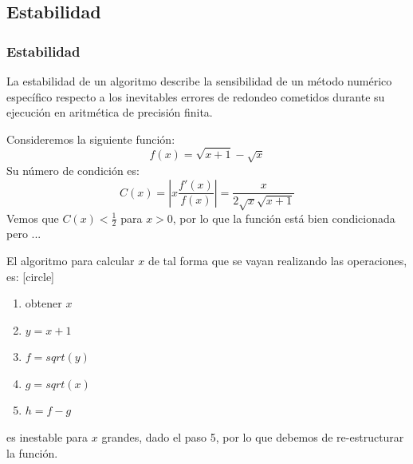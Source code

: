 \subsection{Estabilidad}
\begin{frame}
\frametitle{Estabilidad}
La estabilidad de un algoritmo describe la sensibilidad de un método numérico específico
respecto a los inevitables errores de redondeo cometidos durante su ejecución en aritmética de precisión finita.
\end{frame}
\begin{frame}
Consideremos la siguiente función:
\[ f(x) = \sqrt{x+1} - \sqrt{x} \]
Su número de condición es:
\[ C(x) = \left | x \dfrac{f'(x)}{f(x)} \right | = \dfrac{x}{2 \sqrt{x} \sqrt{x+1}}\]
Vemos que $C(x)< \frac{1}{2}$ para $x>0$, por lo que la función está bien condicionada pero ...
\end{frame}
\begin{frame}
El algoritmo para calcular $x$ de tal forma que se vayan realizando las operaciones, es:
[circle]
\begin{enumerate}[<+->]
\item obtener $x$
\item $y = x + 1$
\item $f = sqrt(y)$
\item $g = sqrt(x)$
\item $h = f - g$
\end{enumerate}
\pause
es inestable para $x$ grandes, dado el paso 5, por lo que debemos de re-estructurar la función.
\end{frame}
